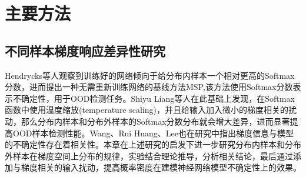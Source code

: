     




\section{主要方法}
\subsection{不同样本梯度响应差异性研究}
Hendrycks等人\cite{hendrycks2017a}观察到训练好的网络倾向于给分布内样本一个相对更高的Softmax分数，进而提出一种无需重新训练网络的基线方法MSP,该方法使用Softmax分数表示不确定性，用于OOD检测任务。Shiyu Liang等人\cite{liang2017enhancing}在此基础上发现，在Softmax函数中使用温度缩放(temperature scaling)，并且给输入加入微小的梯度相关的扰动，那么分布内样本和分布外样本的Softmax分数分布就会增大差异，进而显著提高OOD样本检测性能。Wang\cite{wang2023gradient}、Rui Huang\cite{huang2021importance}、Lee\cite{lee2020gradients}也在研究中指出梯度信息与模型的不确定性存在着相关性。本章在上述研究的启发下进一步研究分布内样本和分布外样本在梯度空间上分布的规律，实验结合理论推导，分析相关结论，最后通过添加与梯度相关的输入扰动，提高概率密度在建模神经网络模型不确定性上的效果。

